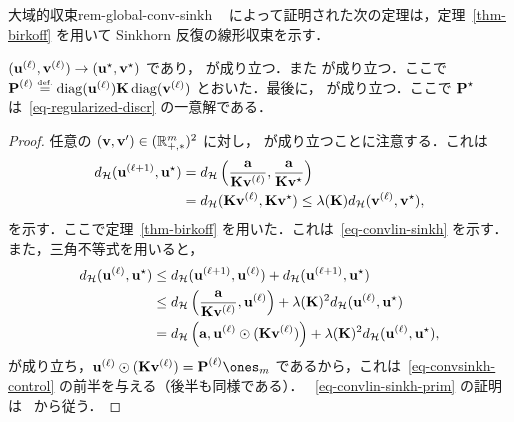 \begin{rem11}{大域的収束}{rem-global-conv-sinkh}
~\citep{franklin1989scaling} によって証明された次の定理は，定理~\ref{thm-birkoff} を用いて Sinkhorn 反復の線形収束を示す．

\begin{thm}
	$(\it{\uD},\it{\vD}) \rightarrow (\uD^\star,\vD^\star)$ であり，
	が成り立つ．また
	が成り立つ．ここで $\it{\P} \eqdef \diag(\it{\uD}) \K \diag(\it{\vD})$ とおいた．最後に，
	\eql{\label{eq-convlin-sinkh-prim}
		\|\log(\it{\P}) - \log(\P^\star)\|_\infty \leq \Hilbert(\it{\uD}, \uD^\star) + \Hilbert(\it{\vD}, \vD^\star),
	}
	が成り立つ．ここで $\P^\star$ は~\eqref{eq-regularized-discr} の一意解である．
\end{thm}

\begin{proof}
	任意の $(\vD,\vD') \in (\RR_{+,*}^m)^2$ に対し，
	が成り立つことに注意する．これは
	\begin{align*}
		\Hilbert(\itt{\uD},\uD^\star) &= \Hilbert\pa{ \frac{\a}{\K \it{\vD}}, \frac{\a}{\K \vD^\star} } \\
		&= \Hilbert( \K \it{\vD}, \K \vD^\star ) \leq \la(\K) \Hilbert( \it{\vD}, \vD^\star ),
	\end{align*}
	を示す．ここで定理~\ref{thm-birkoff} を用いた．これは~\eqref{eq-convlin-sinkh} を示す．また，三角不等式を用いると，
	\begin{align*}
		\Hilbert(\it{\uD},\uD^\star) &\leq \Hilbert(\itt{\uD},\it{\uD}) + \Hilbert(\itt{\uD},\uD^\star) \\
		&\leq \Hilbert\pa{ \frac{\a}{\K \it{\vD}},\it{\uD} } + \la(\K)^2 \Hilbert(\it{\uD},\uD^\star) \\
		&= \Hilbert\pa{ \a,\it{\uD} \odot  ( \K \it{\vD} ) } + \la(\K)^2 \Hilbert(\it{\uD},\uD^\star),
	\end{align*}
	が成り立ち，$\it{\uD} \odot  ( \K \it{\vD} ) = \it{\P}\ones_m$ であるから，これは~\eqref{eq-convsinkh-control} の前半を与える（後半も同様である）．
	~\eqref{eq-convlin-sinkh-prim} の証明は~\citep[Lem. 3]{franklin1989scaling} から従う．
\end{proof}


\end{rem11}
